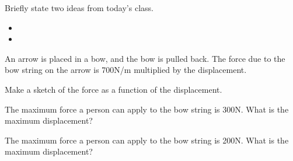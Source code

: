 \postClass

\begin{problem}
\item Briefly state two ideas from today's class.
  \begin{itemize}
  \item 
  \item 
  \end{itemize}
\item 
  \begin{subproblem}
    \item
  \end{subproblem}
\end{problem}



\begin{problem}
\item An arrow is placed in a bow, and the bow is pulled back. The
  force due to the bow string on the arrow is 700N/m multiplied by the
  displacement. 
  \begin{subproblem}
  \item Make a sketch of the force as a function of the displacement.
    \vfill
  \item The maximum force a person can apply to the bow string is
    300N. What is the maximum displacement?
    \vfill
  \item The maximum force a person can apply to the bow string is
    200N. What is the maximum displacement?
    \vfill
  \end{subproblem}
\end{problem}


